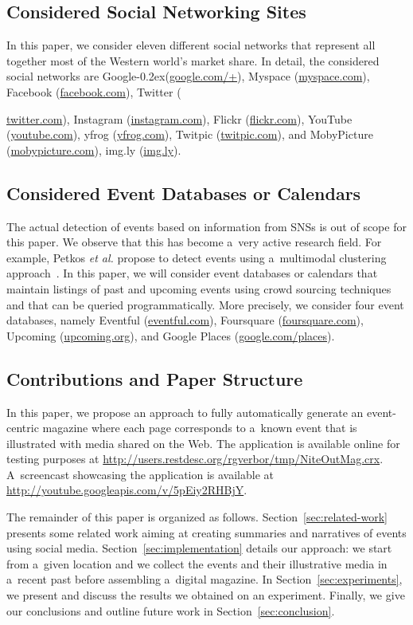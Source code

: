 \documentclass[runningheads,a4paper]{llncs}
\newcommand{\googleplus}{Google\nolinebreak\hspace{0em}\raisebox{.28ex}{\tiny\bf +}\kern-0.2ex\xspace}
\begin{document}
\subsection{Considered Social Networking Sites}
In this paper, we consider eleven different social networks that represent all together most of the Western world's market share. In detail, the considered social networks are
\googleplus (\url{google.com/+}),
Myspace (\url{myspace.com}),
Facebook (\url{facebook.com}),
Twitter ({\url{twitter.com}),
Instagram (\url{instagram.com}),
Flickr (\url{flickr.com}),
YouTube (\url{youtube.com}),
yfrog (\url{yfrog.com}),
Twitpic (\url{twitpic.com}), and
MobyPicture (\url{mobypicture.com}),
\mbox{img.ly} (\url{img.ly}).

\subsection{Considered Event Databases or Calendars}
The actual detection of events based on information from SNSs is out of scope for this paper. We observe that this has become a~very active research field. For example, Petkos \emph{et al.} propose to detect events using a~multimodal clustering approach~\cite{Petkos2012}. In this paper, we will consider event databases or calendars that maintain listings of past and upcoming events using crowd sourcing techniques and that can be queried programmatically. More precisely, we consider four event databases, namely Eventful (\url{eventful.com}), Foursquare (\url{foursquare.com}), Upcoming (\url{upcoming.org}), and Google Places (\url{google.com/places}).

\subsection{Contributions and Paper Structure}
In this paper, we propose an approach to fully automatically generate an event-centric magazine where each page corresponds to a~known event that is illustrated with media shared on the Web.
The application is available online for testing purposes at \url{http://users.restdesc.org/rgverbor/tmp/NiteOutMag.crx}. A~screencast showcasing the application is available at \url{http://youtube.googleapis.com/v/5pEiy2RHBjY}.

The remainder of this paper is organized as follows. Section~\ref{sec:related-work} presents some related work aiming at creating summaries and narratives of events using social media. Section~\ref{sec:implementation} details our approach: we start from a~given location and we collect the events and their illustrative media in a~recent past before assembling a~digital magazine. In Section~\ref{sec:experiments}, we present and discuss the results we obtained on an experiment. Finally, we give our conclusions and outline future work in Section~\ref{sec:conclusion}.

}
\end{document}
